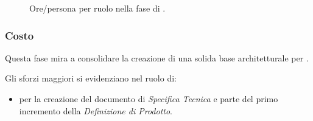 \begin{figure}[H]
\caption{Ore/persona per ruolo nella fase di \PA.}
\label{fig:pa2}

\end{figure}

\pagebreak
\subsubsection{Costo \PA}
\introcosto{\PA}
Questa fase mira a consolidare la creazione di una solida base architetturale per \proj.

Gli sforzi maggiori si evidenziano nel ruolo di:
\begin{itemize}
\item {\PJx} per la creazione del documento di \emph{Specifica Tecnica} e parte del primo incremento della \emph{Definizione di Prodotto}.
\end{itemize}

